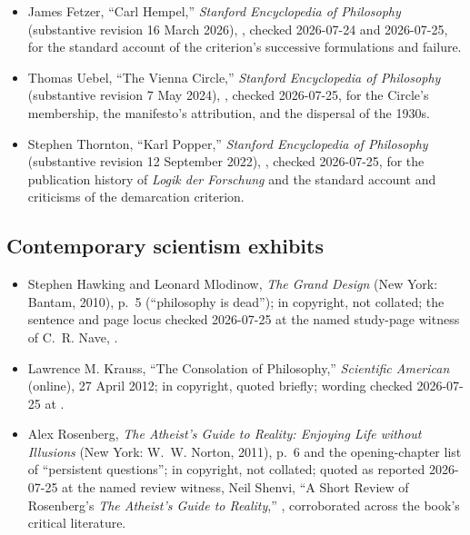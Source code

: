 {\begin{itemize}[itemsep=0pt,parsep=0pt,topsep=0.05em]
\item James Fetzer, ``Carl Hempel,'' \emph{Stanford Encyclopedia of Philosophy} (substantive revision 16 March 2026), , checked 2026-07-24 and 2026-07-25, for the standard account of the criterion's successive formulations and failure.
\item Thomas Uebel, ``The Vienna Circle,'' \emph{Stanford Encyclopedia of Philosophy} (substantive revision 7 May 2024), , checked 2026-07-25, for the Circle's membership, the manifesto's attribution, and the dispersal of the 1930s.
\item Stephen Thornton, ``Karl Popper,'' \emph{Stanford Encyclopedia of Philosophy} (substantive revision 12 September 2022), , checked 2026-07-25, for the publication history of \emph{Logik der Forschung} and the standard account and criticisms of the demarcation criterion.
\end{itemize}}

\subsection*{Contemporary scientism exhibits}

{\fontsize{8.6}{9.6}\selectfont
\begin{itemize}[itemsep=0pt,parsep=0pt,topsep=0.05em]
\item Stephen Hawking and Leonard Mlodinow, \emph{The Grand Design} (New York: Bantam, 2010), p.~5 (``philosophy is dead''); in copyright, not collated; the sentence and page locus checked 2026-07-25 at the named study-page witness of C.~R. Nave, .
\item Lawrence M. Krauss, ``The Consolation of Philosophy,'' \emph{Scientific American} (online), 27 April 2012; in copyright, quoted briefly; wording checked 2026-07-25 at .
\item Alex Rosenberg, \emph{The Atheist's Guide to Reality: Enjoying Life without Illusions} (New York: W.~W. Norton, 2011), p.~6 and the opening-chapter list of ``persistent questions''; in copyright, not collated; quoted as reported 2026-07-25 at the named review witness, Neil Shenvi, ``A Short Review of Rosenberg's \emph{The Atheist's Guide to Reality},'' , corroborated across the book's critical literature.
\end{itemize}}

\endgroup
